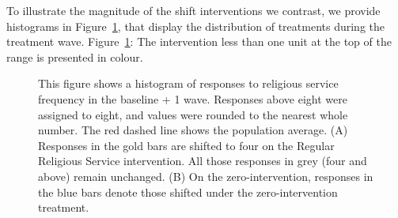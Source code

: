 \documentclass[
  single column]{article}
\begin{document}
To illustrate the magnitude of the shift interventions we contrast, we
provide histograms in Figure~\ref{fig-hist}, that display the
distribution of treatments during the treatment wave.
Figure~\ref{fig-hist}: The intervention less than one unit at the top of
the range is presented in colour.

\begin{figure}


\caption{\label{fig-hist}This figure shows a histogram of responses to
religious service frequency in the baseline + 1 wave. Responses above
eight were assigned to eight, and values were rounded to the nearest
whole number. The red dashed line shows the population average. (A)
Responses in the gold bars are shifted to four on the Regular Religious
Service intervention. All those responses in grey (four and above)
remain unchanged. (B) On the zero-intervention, responses in the blue
bars denote those shifted under the zero-intervention treatment.}

\end{figure}%
\end{document}
